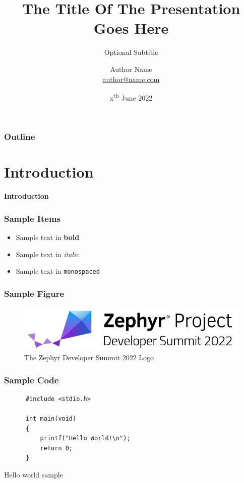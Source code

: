 \documentclass[handout]{beamer}
\title{The Title Of The Presentation\\Goes Here}
\subtitle{Optional Subtitle}
\author{
  \texorpdfstring{
    Author Name\\
    \href{mailto:author@name.com}{author@name.com}
  }{Author Name}
}
\institute{Company Name}
\date{x\textsuperscript{th} June 2022}
\begin{document}

\begin{frame}[plain]
  \titlepage{}
\end{frame}

\begin{frame}
  \frametitle{Outline}
  \tableofcontents
\end{frame}


\section{Introduction}

\begin{frame}
  \begin{center}
    \Huge \textbf{Introduction}
  \end{center}
\end{frame}

\begin{frame}
  \frametitle{Sample Items}

  \begin{itemize}
    \item<1-> Sample text in \textbf{bold}
    \item<2-> Sample text in \textit{italic}
    \item<3-> Sample text in \texttt{monospaced}
  \end{itemize}
\end{frame}

\begin{frame}
  \frametitle{Sample Figure}

  \begin{figure}
    \centering
    \includegraphics[scale=0.7]{zds-logo}
    \caption{The Zephyr Developer Summit 2022 Logo}
  \end{figure}
\end{frame}

\begin{frame}[fragile]
  \frametitle{Sample Code}

  \begin{listing}[H]
    \begin{verbatim}
      #include <stdio.h>

      int main(void)
      {
          printf("Hello World!\n");
          return 0;
      }
    \end{verbatim}
    \caption{Hello world sample}
  \end{listing}
\end{frame}
\end{document}
